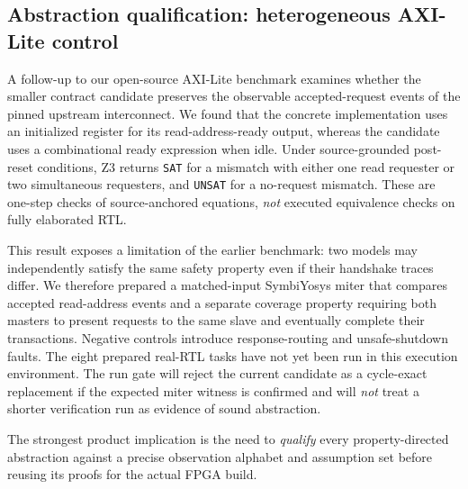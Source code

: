 \subsection{Abstraction qualification: heterogeneous AXI-Lite control}
A follow-up to our open-source AXI-Lite benchmark examines whether the smaller
contract candidate preserves the observable accepted-request events of the
pinned upstream interconnect. We found that the concrete implementation uses
an initialized register for its read-address-ready output, whereas the candidate
uses a combinational ready expression when idle. Under source-grounded
post-reset conditions, Z3 returns \texttt{SAT} for a mismatch with either one
read requester or two simultaneous requesters, and \texttt{UNSAT} for a
no-request mismatch. These are one-step checks of source-anchored equations,
\emph{not} executed equivalence checks on fully elaborated RTL.

This result exposes a limitation of the earlier benchmark: two models may
independently satisfy the same safety property even if their handshake traces
differ. We therefore prepared a matched-input SymbiYosys miter that compares
accepted read-address events and a separate coverage property requiring both
masters to present requests to the same slave and eventually complete their
transactions. Negative controls introduce response-routing and unsafe-shutdown
faults. The eight prepared real-RTL tasks have not yet been run in this
execution environment. The run gate will reject the current candidate as a
cycle-exact replacement if the expected miter witness is confirmed and will
\emph{not} treat a shorter verification run as evidence of sound abstraction.

The strongest product implication is the need to \emph{qualify} every
property-directed abstraction against a precise observation alphabet and
assumption set before reusing its proofs for the actual FPGA build.
